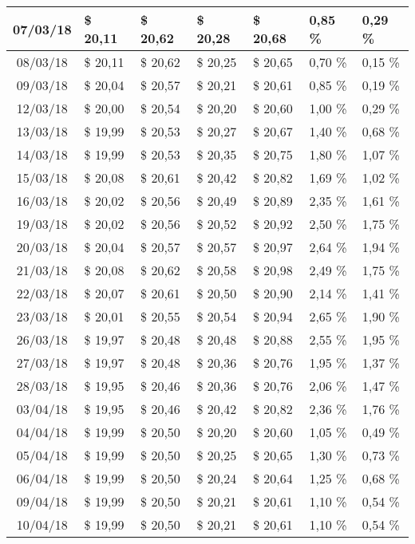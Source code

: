 \begin{center}
\begin{longtable}{|c|p{1.5cm}|p{1.5cm}|p{1.5cm}|p{1.5cm}|p{1.5cm}|p{1.5cm}|}
07/03/18 & \$ 20,11 & \$ 20,62 & \$ 20,28 & \$ 20,68 & 0,85 \% & 0,29 \% \\ \hline
08/03/18 & \$ 20,11 & \$ 20,62 & \$ 20,25 & \$ 20,65 & 0,70 \% & 0,15 \% \\ \hline
09/03/18 & \$ 20,04 & \$ 20,57 & \$ 20,21 & \$ 20,61 & 0,85 \% & 0,19 \% \\ \hline
12/03/18 & \$ 20,00 & \$ 20,54 & \$ 20,20 & \$ 20,60 & 1,00 \% & 0,29 \% \\ \hline
13/03/18 & \$ 19,99 & \$ 20,53 & \$ 20,27 & \$ 20,67 & 1,40 \% & 0,68 \% \\ \hline
14/03/18 & \$ 19,99 & \$ 20,53 & \$ 20,35 & \$ 20,75 & 1,80 \% & 1,07 \% \\ \hline
15/03/18 & \$ 20,08 & \$ 20,61 & \$ 20,42 & \$ 20,82 & 1,69 \% & 1,02 \% \\ \hline
16/03/18 & \$ 20,02 & \$ 20,56 & \$ 20,49 & \$ 20,89 & 2,35 \% & 1,61 \% \\ \hline
19/03/18 & \$ 20,02 & \$ 20,56 & \$ 20,52 & \$ 20,92 & 2,50 \% & 1,75 \% \\ \hline
20/03/18 & \$ 20,04 & \$ 20,57 & \$ 20,57 & \$ 20,97 & 2,64 \% & 1,94 \% \\ \hline
21/03/18 & \$ 20,08 & \$ 20,62 & \$ 20,58 & \$ 20,98 & 2,49 \% & 1,75 \% \\ \hline
22/03/18 & \$ 20,07 & \$ 20,61 & \$ 20,50 & \$ 20,90 & 2,14 \% & 1,41 \% \\ \hline
23/03/18 & \$ 20,01 & \$ 20,55 & \$ 20,54 & \$ 20,94 & 2,65 \% & 1,90 \% \\ \hline
26/03/18 & \$ 19,97 & \$ 20,48 & \$ 20,48 & \$ 20,88 & 2,55 \% & 1,95 \% \\ \hline
27/03/18 & \$ 19,97 & \$ 20,48 & \$ 20,36 & \$ 20,76 & 1,95 \% & 1,37 \% \\ \hline
28/03/18 & \$ 19,95 & \$ 20,46 & \$ 20,36 & \$ 20,76 & 2,06 \% & 1,47 \% \\ \hline
03/04/18 & \$ 19,95 & \$ 20,46 & \$ 20,42 & \$ 20,82 & 2,36 \% & 1,76 \% \\ \hline
04/04/18 & \$ 19,99 & \$ 20,50 & \$ 20,20 & \$ 20,60 & 1,05 \% & 0,49 \% \\ \hline
05/04/18 & \$ 19,99 & \$ 20,50 & \$ 20,25 & \$ 20,65 & 1,30 \% & 0,73 \% \\ \hline
06/04/18 & \$ 19,99 & \$ 20,50 & \$ 20,24 & \$ 20,64 & 1,25 \% & 0,68 \% \\ \hline
09/04/18 & \$ 19,99 & \$ 20,50 & \$ 20,21 & \$ 20,61 & 1,10 \% & 0,54 \% \\ \hline
10/04/18 & \$ 19,99 & \$ 20,50 & \$ 20,21 & \$ 20,61 & 1,10 \% & 0,54 \% \\ \hline

\end{longtable}
\end{center}
